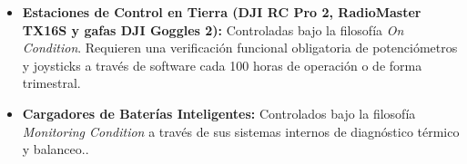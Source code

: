\begin{itemize}
    \item \textbf{Estaciones de Control en Tierra (DJI RC Pro 2, RadioMaster TX16S y gafas DJI Goggles 2):} Controladas bajo la filosofía \textit{On Condition}. Requieren una verificación funcional obligatoria de potenciómetros y joysticks a través de software cada 100 horas de operación o de forma trimestral.
    \item \textbf{Cargadores de Baterías Inteligentes:} Controlados bajo la filosofía \textit{Monitoring Condition} a través de sus sistemas internos de diagnóstico térmico y balanceo..
\end{itemize}